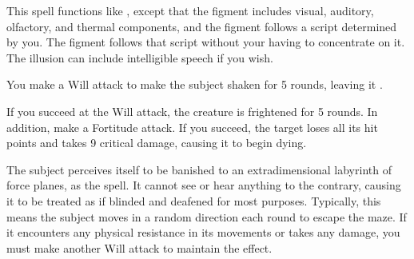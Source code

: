 \spelldur{\durmed \dismissable}
\begin{spelleffect}
    This spell functions like , except that the figment includes visual, auditory, olfactory, and thermal components, and the figment follows a script determined by you. The figment follows that script without your having to concentrate on it. The illusion can include intelligible speech if you wish.
\end{spelleffect}

\begin{spelleffect}
    You make a Will attack to make the subject shaken for 5 rounds, leaving it \vulnerable.
\end{spelleffect}
\begin{spellblood}
    If you succeed at the Will attack, the creature is frightened for 5 rounds. In addition, make a Fortitude attack. If you succeed, the target loses all its hit points and takes 9 critical damage, causing it to begin dying.
\end{spellblood}

\spelldur{\durmed}
\begin{spelleffect}
    The subject perceives itself to be banished to an extradimensional labyrinth of force planes, as the  spell. It cannot see or hear anything to the contrary, causing it to be treated as if blinded and deafened for most purposes. Typically, this means the subject moves in a random direction each round to escape the maze. If it encounters any physical resistance in its movements or takes any damage, you must make another Will attack to maintain the effect.
\end{spelleffect}

